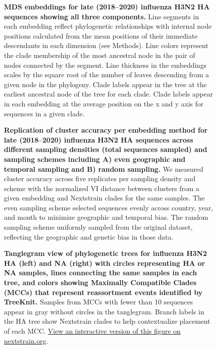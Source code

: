 \documentclass[webpdf,contemporary,large,single]{oup-authoring-template}%
\theoremstyle{thmstyleone}%
\theoremstyle{thmstyletwo}%
\theoremstyle{thmstylethree}%
\begin{document}
\begin{figure}[H]
\caption{{\bf MDS embeddings for late (2018--2020) influenza H3N2 HA sequences showing all three components.}
Line segments in each embedding reflect phylogenetic relationships with internal node positions calculated from the mean positions of their immediate descendants in each dimension (see Methods).
Line colors represent the clade membership of the most ancestral node in the pair of nodes connected by the segment.
Line thickness in the embeddings scales by the square root of the number of leaves descending from a given node in the phylogeny.
Clade labels appear in the tree at the earliest ancestral node of the tree for each clade.
Clade labels appear in each embedding at the average position on the x and y axis for sequences in a given clade.}\label{S_Fig_late_flu_mds_embeddings}
\end{figure}

\begin{figure}[H]
\caption{{\bf Replication of cluster accuracy per embedding method for late (2018--2020) influenza H3N2 HA sequences across different sampling densities (total sequences sampled) and sampling schemes including A) even geographic and temporal sampling and B) random sampling.}
  We measured cluster accuracy across five replicates per sampling density and scheme with the normalized VI distance between clusters from a given embedding and Nextstrain clades for the same samples.
  The even sampling scheme selected sequences evenly across country, year, and month to minimize geographic and temporal bias.
  The random sampling scheme uniformly sampled from the original dataset, reflecting the geographic and genetic bias in those data.}\label{S_Fig_late_flu_replication_of_cluster_accuracy}
\end{figure}

\begin{figure}[H]
\caption{{\bf Tanglegram view of phylogenetic trees for influenza H3N2 HA (left) and NA (right) with circles representing HA or NA samples, lines connecting the same samples in each tree, and colors showing Maximally Compatible Clades (MCCs) that represent reassortment events identified by TreeKnit.}
  Samples from MCCs with fewer than 10 sequences appear in gray without circles in the tanglegram.
  Branch labels in the HA tree show Nextstrain clades to help contextualize placement of each MCC.
  \href{https://nextstrain.org/groups/blab/cartography/flu-seasonal-h3n2-ha-2016-2018-reassort:groups/blab/cartography/flu-seasonal-h3n2-na-2016-2018-reassort?f_MCC=MCC_0,MCC_1,MCC_10,MCC_11,MCC_12,MCC_13,MCC_14,MCC_2,MCC_3,MCC_4,MCC_5,MCC_6,MCC_7,MCC_8,MCC_9}{View an interactive version of this figure on nextstrain.org}.
}\label{S_Fig_ha_na_tangletree}
\end{figure}
\end{document}
